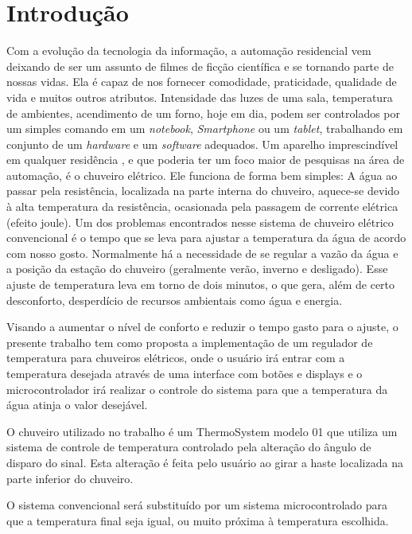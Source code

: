 \chapter{Introdução}

Com a evolução da tecnologia da informação, a automação residencial vem deixando de ser um 
assunto de filmes de ficção científica e se tornando parte de nossas vidas. Ela é capaz de 
nos  fornecer  comodidade,  praticidade,  qualidade  de  vida  e  muitos  outros  atributos. 
Intensidade das luzes de uma sala, temperatura de ambientes, acendimento de um forno, 
hoje  em  dia,  podem  ser  controlados  por  um  simples  comando  em  um  \textit{notebook}, 
\textit{Smartphone} ou um \textit{tablet}, trabalhando em conjunto de um \textit{hardware} e um \textit{software} adequados.
Um  aparelho  imprescindível em qualquer residência , e que  poderia ter um foco 
maior de pesquisas na área de automação, é o chuveiro elétrico. Ele funciona
de  forma  bem  simples:  A  água  ao  passar  pela  resistência,  localizada  na  parte  interna  do 
chuveiro, aquece-se devido à alta temperatura da resistência, ocasionada pela passagem de 
corrente elétrica (efeito joule).
Um dos problemas encontrados nesse sistema de chuveiro elétrico convencional 
é o tempo que se leva para ajustar a temperatura da água de acordo com nosso gosto. 
Normalmente há a necessidade de se regular a vazão da água e a posição da estação do chuveiro (geralmente verão, inverno e desligado). Esse ajuste de temperatura leva em torno de dois minutos, o que gera, além de certo desconforto, desperdício de recursos ambientais como água e energia.

Visando a aumentar o nível de conforto e reduzir o tempo gasto para o ajuste, o presente trabalho tem como proposta a implementação de um regulador de temperatura para chuveiros elétricos, onde o usuário irá entrar com a temperatura desejada através de uma interface com botões e displays e o microcontrolador irá realizar o controle do sistema para que a temperatura da água atinja o valor desejável.

O chuveiro utilizado no trabalho é um ThermoSystem modelo 01 que utiliza um sistema de controle de temperatura controlado pela alteração do ângulo de disparo do sinal. Esta alteração é feita pelo usuário ao girar a haste localizada na parte inferior do chuveiro.

O sistema convencional será substituído  por um sistema microcontrolado para que a temperatura final seja igual, ou muito próxima à temperatura escolhida.

